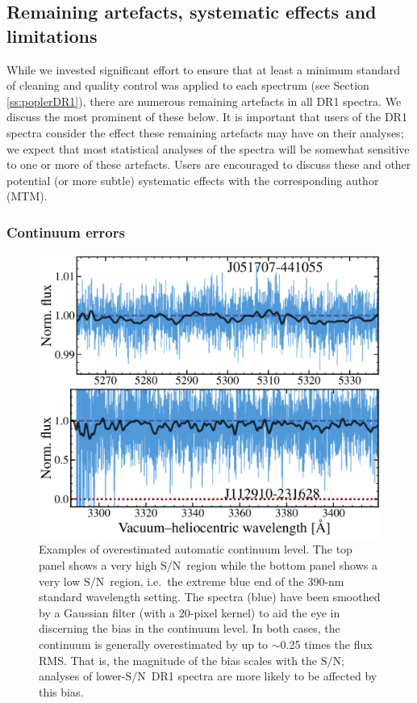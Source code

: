 \documentclass[fleqn,usenatbib,usedcolumn]{mnras}
\newcommand{\Sref}[1]{Section \ref{#1}}
\newcommand{\SN}{\ensuremath{\textrm{S/N}}}
\begin{document}
\subsection{Remaining artefacts, systematic effects and limitations}\label{ss:artefacts}

While we invested significant effort to ensure that at least a minimum standard of cleaning and quality control was applied to each spectrum (see \Sref{ss:poplerDR1}), there are numerous remaining artefacts in all DR1 spectra. We discuss the most prominent of these below. It is important that users of the DR1 spectra consider the effect these remaining artefacts may have on their analyses; we expect that most statistical analyses of the spectra will be somewhat sensitive to one or more of these artefacts. Users are encouraged to discuss these and other potential (or more subtle) systematic effects with the corresponding author (MTM).

\subsubsection{Continuum errors}\label{sss:art_cont}

\begin{figure}
\begin{center}
\includegraphics[width=0.95\columnwidth]{DR1_cont_overestimate.pdf}
\vspace{-1em}
\caption{Examples of overestimated automatic continuum level. The top panel shows a very high \SN\ region while the bottom panel shows a very low \SN\ region, i.e.\ the extreme blue end of the 390-nm standard wavelength setting. The spectra (blue) have been smoothed by a Gaussian filter (with a 20-pixel kernel) to aid the eye in discerning the bias in the continuum level. In both cases, the continuum is generally overestimated by up to $\sim$0.25 times the flux RMS. That is, the magnitude of the bias scales with the \SN; analyses of lower-\SN\ DR1 spectra are more likely to be affected by this bias.}
\label{f:cont_overest}
\end{center}
\end{figure}
\end{document}
